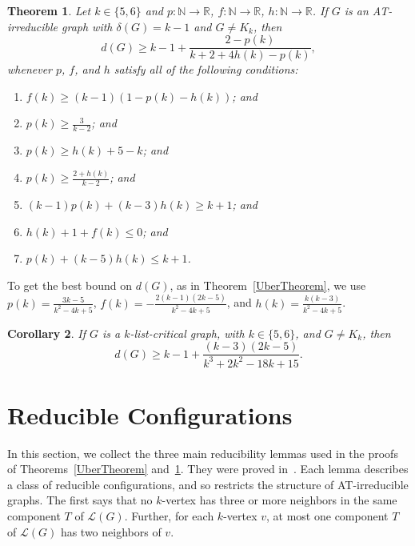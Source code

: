 \documentclass[12pt]{article}
\theoremstyle{plain}
\newtheorem{thm}{Theorem}[section]
\newtheorem{cor}[thm]{Corollary}
\theoremstyle{definition}
\newtheorem{defn}{Definition}
\theoremstyle{remark}
\newcommand{\fancy}[1]{\mathcal{#1}}
\newcommand{\IN}{\mathbb{N}}
\newcommand{\IR}{\mathbb{R}}
\renewcommand{\L}{\fancy{L}}
\newcommand{\func}[3]{#1\colon #2 \rightarrow #3}
\newcommand{\DefinedAs}{\mathrel{\mathop:}=}
\begin{document}
\begin{thm}\label{Uber56}
	Let $k \in\{5,6\}$ and $\func{p}{\IN}{\IR}$, $\func{f}{\IN}{\IR}$, $\func{h}{\IN}{\IR}$.  If $G$ is an AT-irreducible graph with $\delta(G) = k-1$ and $G\ne K_k$, then 
	\[d(G) \ge k-1 + \frac{2-p(k)}{k+2 + 4h(k) - p(k)},\]
	whenever $p$, $f$, and $h$ satisfy all of the following conditions:
	\begin{enumerate}
	\item[(1)] $f(k) \ge (k-1)(1- p(k) - h(k))$; and	
	\item[(2)] $p(k) \ge \frac{3}{k-2}$; and
	\item[(3)] $p(k) \ge h(k) + 5 - k$; and
	\item[(4)] $p(k) \ge \frac{2+h(k)}{k-2}$; and
	\item[(5)] $(k-1)p(k) + (k-3)h(k) \ge k+1$; and
	\item[(6)] $h(k) + 1 + f(k) \le 0$; and
	\item[(7)] $p(k) + (k-5)h(k) \le k+1$.
	\end{enumerate}
\end{thm}

To get the best bound on $d(G)$, as in Theorem~\ref{UberTheorem}, we use $p(k)
= \frac{3k-5}{k^2 - 4k + 5}$, $f(k) = -\frac{2(k-1)(2k-5)}{k^2 - 4k + 5}$, and
$h(k) = \frac{k(k-3)}{k^2 - 4k + 5}$.
\begin{cor}\label{MinorCor}
If $G$ is a $k$-list-critical graph, with $k\in\{5,6\}$, and $G\ne K_k$, then
 \[d(G) \ge k-1 + \frac{(k-3)(2k-5)}{k^3 + 2k^2 - 18k + 15}.\]
\end{cor}

\section{Reducible Configurations}
In this section, we collect the three main reducibility lemmas used in the
proofs of Theorems~\ref{UberTheorem} and~\ref{Uber56}.  They were proved
in~\cite{OreVizing}.  Each lemma describes a class of reducible configurations,
and so restricts the structure of AT-irreducible graphs.
%
The first says that no $k$-vertex has three or more neighbors in the same component
$T$ of $\L(G)$.  Further, for each $k$-vertex $v$,  at most one component $T$ of
$\L(G)$ has two neighbors of $v$.
\end{document}
